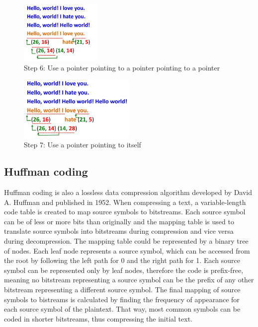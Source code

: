 \begin{figure}[H] \caption{Step 6: Use a pointer pointing to a pointer pointing
to a pointer} \centering
\includegraphics[width=0.35\textwidth]{diagrams/lz77_6.png}\end{figure}
\begin{figure}[H] \caption{Step 7: Use a pointer pointing to itself}
\centering
\includegraphics[width=0.5\textwidth]{diagrams/lz77_7.png}\end{figure}


\subsection{Huffman coding}\label{subsec:huffman}

Huffman coding is also a lossless data compression algorithm developed by David
A. Huffman and published in 1952. \cite{huffman} When compressing a text, a
variable-length code table is created to map source symbols to bitstreams. Each
source symbol can be of less or more bits than originally and the mapping table
is used to translate source symbols into bitstreams during compression and vice
versa during decompression. The mapping table could be represented by a binary
tree of nodes. Each leaf node represents a source symbol, which can be accessed
from the root by following the left path for 0 and the right path for 1. Each
source symbol can be represented only by leaf nodes, therefore the code is
prefix-free, meaning no bitstream representing a source symbol can be the prefix
of any other bitstream representing a different source symbol. The final mapping
of source symbols to bistreams is calculated by finding the frequency of
appearance for each source symbol of the plaintext. That way, most common
symbols can be coded in shorter bitstreams, thus compressing the initial text.


